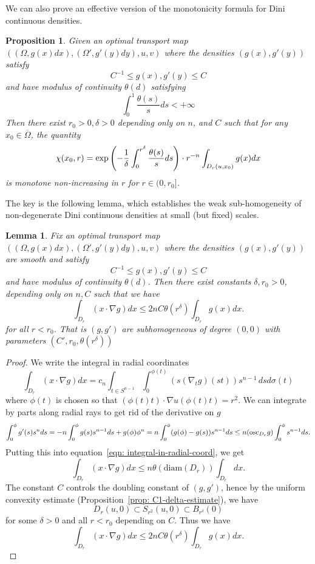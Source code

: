 \documentclass[12pt,reqno]{amsart}
\newtheorem{lem}{Lemma}[section]
\newtheorem{prop}{Proposition}[section]
\numberwithin{equation}{section}
\begin{document}
We can also prove an effective version of the monotonicity formula for Dini continuous densities. 
\begin{prop}\label{prop: effective-monotonicity-for Holder-density}
    Given an optimal transport map $((\Omega, g(x)dx), (\Omega', g'(y)dy), u, v)$ where the densities $(g(x), g'(y))$ satisfy
	\[C^{-1}\leq g(x), g'(y)\leq C\]
	and have modulus of continuity $\theta(d)$ satisfying 
    \[
    \int_0^1 \frac{\theta(s)}{s} ds < +\infty
    \]
   Then there exist $r_0>0, \delta>0$ depending only on $n$, and $C$ such that for any $x_0\in\overline\Omega$, the quantity
    \[\chi(x_0, r) = {\rm exp}\left(-\frac{1}{\delta}\int_{0}^{r^{\delta}}\frac{\theta(s)}{s}ds\right)\cdot r^{-n}\int_{D_r(u, x_0)}g(x)dx\]
    is monotone non-increasing in $r$ for $r\in (0, r_0]$. 
\end{prop}
The key is the following lemma, which establishes the weak sub-homogeneity of non-degenerate Dini continuous densities at small (but fixed) scales. 
\begin{lem}\label{lem: weak-sub-homogeneous-for-C-alpha-density}
Fix an optimal transport map $((\Omega, g(x)dx), (\Omega', g'(y)dy), u, v)$ where the densities $(g(x), g'(y))$ are smooth and satisfy
	\[C^{-1}\leq g(x), g'(y)\leq C\]
	and have modulus of continuity $\theta(d)$. 
    Then there exist constants $\delta, r_0>0$, depending only on $n, C$ such that we have
    \[\int_{D_r}(x\cdot \nabla g)dx \leq 2nC\theta(r^\delta)\int_{D_r}g(x)dx.\]
    for all $r<r_0$.  That is $(g,g')$ are subhomogeneous of degree $(0,0)$ with parameters $(C',r_0,\theta(r^\delta)) $
\end{lem}
\begin{proof}
    We write the integral in radial coordinates
    \begin{equation}\label{eqn: integral-in-radial-coord}
        \int_{D_r}(x\cdot \nabla g)dx = c_n\int_{t\in S^{n-1}}\int_0^{\phi(t)}(s(\nabla_t g)(st))s^{n-1}\,dsd\sigma(t)
    \end{equation}
    where $\phi(t)$ is chosen so that $(\phi(t)t)\cdot \nabla u(\phi(t)t) = r^2$. We can integrate by parts along radial rays to get rid of the derivative on $g$
    \[\int_0^\phi g'(s)s^nds = -n\int_0^\phi g(s)s^{n-1}ds+g(\phi)\phi^{n} = n\int_0^\phi(g(\phi)-g(s))s^{n-1}ds\leq n ({\rm osc}_{D_r} g)\int_0^\phi s^{n-1}ds.\]
    Putting this into equation~\eqref{eqn: integral-in-radial-coord}, we get 
    \[\int_{D_r}(x\cdot \nabla g)dx \leq n\theta(\text{diam}(D_r))\int_{D_r}dx.\]
    The constant $C$ controls the doubling constant of $(g, g')$, hence by the uniform convexity estimate (Proposition~\ref{prop: C1-delta-estimate}), we have \[D_r(u, 0)\subset S_{r^2}(u, 0)\subset B_{r^{\delta}}(0)\] for some $\delta>0$ and all $r <r_0$ depending on $C$. Thus we have
    \[
    \int_{D_r}(x\cdot \nabla g)dx \leq 2nC\theta(r^{\delta})\int_{D_r}g(x)dx.
    \]
\end{proof}
\end{document}

